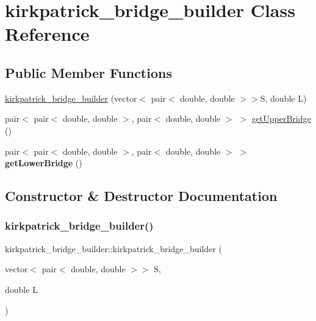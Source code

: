 \hypertarget{classkirkpatrick__bridge__builder}{}\section{kirkpatrick\+\_\+bridge\+\_\+builder Class Reference}
\label{classkirkpatrick__bridge__builder}
\subsection*{Public Member Functions}
\begin{DoxyCompactItemize}
\item 
\hyperlink{classkirkpatrick__bridge__builder_a7daa5d4e13c0f6851ba1cedd4c2b745b}{kirkpatrick\+\_\+bridge\+\_\+builder} (vector$<$ pair$<$ double, double $>$$>$S, double L)
\item 
pair$<$ pair$<$ double, double $>$, pair$<$ double, double $>$ $>$ \hyperlink{classkirkpatrick__bridge__builder_a98f6901abab1a0d8642a0d302675bba0}{get\+Upper\+Bridge} ()
\item 
\mbox{\label{classkirkpatrick__bridge__builder_ad4224e6f6ad0c361af522a608694adbb}} 
pair$<$ pair$<$ double, double $>$, pair$<$ double, double $>$ $>$ {\bfseries get\+Lower\+Bridge} ()
\end{DoxyCompactItemize}


\subsection{Constructor \& Destructor Documentation}
\mbox{\label{classkirkpatrick__bridge__builder_a7daa5d4e13c0f6851ba1cedd4c2b745b}} 
\subsubsection{\texorpdfstring{kirkpatrick\+\_\+bridge\+\_\+builder()}{kirkpatrick\_bridge\_builder()}}
{\footnotesize\ttfamily kirkpatrick\+\_\+bridge\+\_\+builder\+::kirkpatrick\+\_\+bridge\+\_\+builder (\begin{DoxyParamCaption}\item[{vector$<$ pair$<$ double, double $>$$>$}]{S,  }\item[{double}]{L }\end{DoxyParamCaption})\hspace{0.3cm}{\ttfamily [inline]}}

